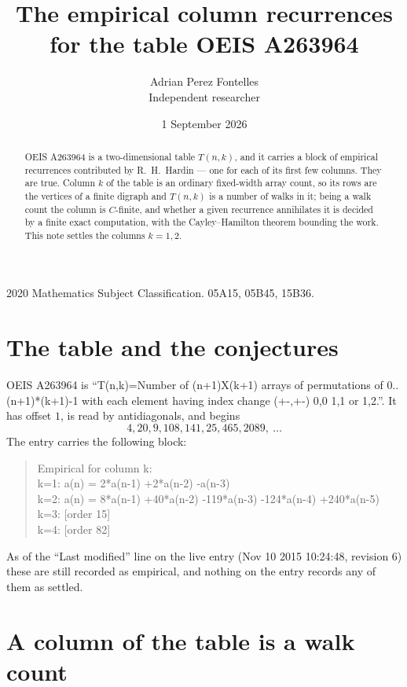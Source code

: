 \documentclass[11pt,a4paper]{article}
\title{The empirical column recurrences for the table OEIS A263964}
\author{Adrian Perez Fontelles\\ \small Independent researcher}
\date{1 September 2026}
\theoremstyle{plain}
\theoremstyle{definition}
\begin{document}
\maketitle

\begin{abstract}
OEIS A263964 is a two-dimensional table $T(n,k)$, and it carries a block of empirical
recurrences contributed by R.~H.~Hardin --- one for each of its first few columns. They are
true. Column $k$ of the table is an ordinary fixed-width array count, so its rows are the
vertices of a finite digraph and $T(n,k)$ is a number of walks in it; being a walk count the
column is $C$-finite, and whether a given recurrence annihilates it is decided by a finite
exact computation, with the Cayley--Hamilton theorem bounding the work. This note settles the columns $k=1, 2$.
\end{abstract}

\noindent\small 2020 Mathematics Subject Classification. 05A15, 05B45, 15B36.\normalsize

\section{The table and the conjectures}

OEIS A263964 is ``T(n,k)=Number of (n+1)X(k+1) arrays of permutations of 0..(n+1)*(k+1)-1 with each element having index change (+-,+-) 0,0 1,1 or 1,2.''. It has offset $1$, is
read by antidiagonals, and begins
\[
4, 20, 9, 108, 141, 25, 465, 2089,\ \dots
\]
The entry carries the following block:
\begin{quote}\small
Empirical for column k:\\
k=1: a(n) = 2*a(n-1) +2*a(n-2) -a(n-3)\\
k=2: a(n) = 8*a(n-1) +40*a(n-2) -119*a(n-3) -124*a(n-4) +240*a(n-5)\\
k=3: [order 15]\\
k=4: [order 82]\\
\end{quote}
As of the ``Last modified'' line on the live entry (Nov 10 2015 10:24:48, revision 6) these are still
recorded as empirical, and nothing on the entry records any of them as settled.

\section{A column of the table is a walk count}
\end{document}
